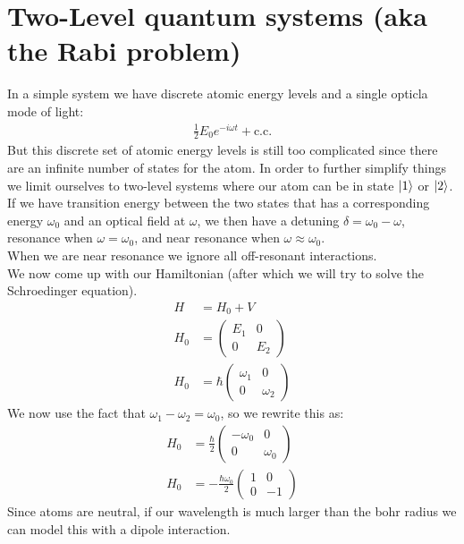 \section{Two-Level quantum systems (aka the Rabi problem)}
In a simple system we have discrete atomic energy levels and a single opticla mode of light:
\begin{align*}
	\frac{1}{2} E_0 e^{-i\omega t} + \text{c.c.}
\end{align*}
But this discrete set of atomic energy levels is still too complicated since there are an infinite number of states for the atom. In order to further simplify things we limit ourselves to two-level systems where our atom can be in state $\ket{1}$ or $\ket{2}$.\\
If we have transition energy between the two states that has a corresponding energy $\omega_0$ and an optical field at $\omega$, we then have a detuning $\delta = \omega_0-\omega$, resonance when $\omega=\omega_0$, and near resonance when $\omega\approx\omega_0$.\\
When we are near resonance we ignore all off-resonant interactions.\\
We now come up with our Hamiltonian (after which we will try to solve the Schroedinger equation).
\begin{align*}
	H &= H_0 + V \\
	H_0 &= \begin{pmatrix} E_1 & 0 \\ 0 & E_2\end{pmatrix} \\
	H_0 &= \hbar\begin{pmatrix} \omega_1 & 0 \\ 0 & \omega_2\end{pmatrix}
\end{align*}
We now use the fact that $\omega_1 - \omega_2 = \omega_0$, so we rewrite this as:
\begin{align*}
	H_0 &= \frac{\hbar}{2}\begin{pmatrix} -\omega_0 & 0 \\ 0 & \omega_0\end{pmatrix} \\
	H_0 &= -\frac{\hbar\omega_0}{2}\begin{pmatrix} 1 & 0 \\ 0 & -1\end{pmatrix}
\end{align*}
Since atoms are neutral, if our wavelength is much larger than the bohr radius we can model this with a dipole interaction.\\
